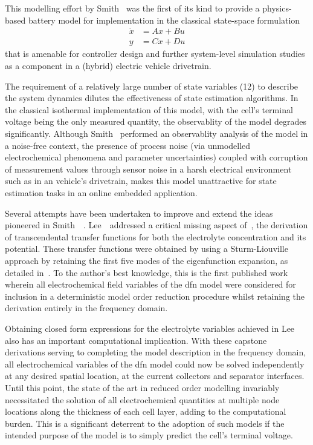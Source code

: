 This modelling effort  by Smith~\etal{} was the  first of its kind  to provide a
physics-based  battery model  for  implementation in  the classical  state-space
formulation
\begin{equation}\label{eq:statespace}
    \begin{aligned}
        \dot{x} &= Ax + Bu \\
        y &= Cx + Du
    \end{aligned}
\end{equation}
that is amenable for controller  design and  further system-level simulation
studies \eg{}  as a component in a (hybrid) electric vehicle drivetrain.


The requirement of a relatively large number of state variables (12) to describe
the system dynamics dilutes the effectiveness of state estimation algorithms. In
the classical isothermal implementation of  this model, with the cell's terminal
voltage being the only measured quantity, the observablity of the model degrades
significantly. Although Smith~\etal{} performed  an observablity analysis of the
model in  a noise-free context,  the presence  of process noise  (via unmodelled
electrochemical phenomena  and parameter uncertainties) coupled  with corruption
of measurement  values through  sensor noise in  a harsh  electrical environment
such as  in an  vehicle's drivetrain,  makes this  model unattractive  for state
estimation tasks in an online embedded application.


Several attempts have been undertaken to  improve and extend the ideas pioneered
in  Smith~\etal{}~\cite{Smith2007}.  Lee~\etal{}~addressed  a  critical  missing
aspect  of~\cite{Smith2007}, \viz{}  the derivation  of transcendental  transfer
functions  for  both the  electrolyte  concentration  and its  potential.  These
transfer  functions  were  obtained  by  using  a  Sturm-Liouville  approach  by
retaining  the first  five modes  of  the eigenfunction  expansion, as  detailed
in~\cite{Lee2012}. To the  author's best knowledge, this is  the first published
work wherein  all electrochemical  field variables of  the \gls{dfn}  model were
considered  for inclusion  in a  deterministic model  order reduction  procedure
whilst retaining the derivation entirely in the frequency domain.


Obtaining  closed form  expressions for  the electrolyte  variables achieved  in
Lee~\etal{} also has an important computational implication. With these capstone
derivations serving to completing the model description in the frequency domain,
all  electrochemical  variables of  the  \gls{dfn}  model  could now  be  solved
independently at any  desired spatial location, \eg{} at  the current collectors
and separator  interfaces. Until  this point,  the state of  the art  in reduced
order  modelling invariably  necessitated  the solution  of all  electrochemical
quantities at  multiple node locations along  the thickness of each  cell layer,
adding  to the  computational burden.  This is  a significant  deterrent to  the
adoption  of such  models if  the intended  purpose of  the model  is to  simply
predict the cell's terminal voltage.


